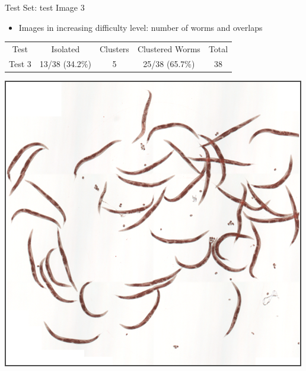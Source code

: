 \documentclass[xcolor=table]{beamer}
\begin{document}
\begin{frame}{Test Set: test Image 3}

  \begin{itemize}
  \item Images in increasing difficulty level: number of worms
    and overlaps
  \end{itemize}

\begin{table}[h]
\begin{center}
\begin{tabular}[h]{|c|c|c|c|c|}
    \hline
    \rowcolor{gray!35}
    Test & Isolated & Clusters & Clustered Worms & Total\\
    Test 3 & 13/38 (34.2\%)& 5 & 25/38 (65.7\%) & 38 \\
    \hline
  \end{tabular}
\end{center}
\end{table}

\begin{center}
\includegraphics[scale=0.25]{results/test3/original3}
\end{center}
\end{frame}



\end{document}
